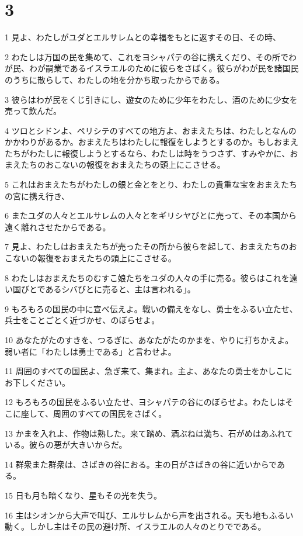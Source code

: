 \chapter{3}

\par 1 見よ、わたしがユダとエルサレムとの幸福をもとに返すその日、その時、
\par 2 わたしは万国の民を集めて、これをヨシャパテの谷に携えくだり、その所でわが民、わが嗣業であるイスラエルのために彼らをさばく。彼らがわが民を諸国民のうちに散らして、わたしの地を分かち取ったからである。
\par 3 彼らはわが民をくじ引きにし、遊女のために少年をわたし、酒のために少女を売って飲んだ。
\par 4 ツロとシドンよ、ペリシテのすべての地方よ、おまえたちは、わたしとなんのかかわりがあるか。おまえたちはわたしに報復をしようとするのか。もしおまえたちがわたしに報復しようとするなら、わたしは時をうつさず、すみやかに、おまえたちのおこないの報復をおまえたちの頭上にこさせる。
\par 5 これはおまえたちがわたしの銀と金とをとり、わたしの貴重な宝をおまえたちの宮に携え行き、
\par 6 またユダの人々とエルサレムの人々とをギリシヤびとに売って、その本国から遠く離れさせたからである。
\par 7 見よ、わたしはおまえたちが売ったその所から彼らを起して、おまえたちのおこないの報復をおまえたちの頭上にこさせる。
\par 8 わたしはおまえたちのむすこ娘たちをユダの人々の手に売る。彼らはこれを遠い国びとであるシバびとに売ると、主は言われる」。
\par 9 もろもろの国民の中に宣べ伝えよ。戦いの備えをなし、勇士をふるい立たせ、兵士をことごとく近づかせ、のぼらせよ。
\par 10 あなたがたのすきを、つるぎに、あなたがたのかまを、やりに打ちかえよ。弱い者に「わたしは勇士である」と言わせよ。
\par 11 周囲のすべての国民よ、急ぎ来て、集まれ。主よ、あなたの勇士をかしこにお下しください。
\par 12 もろもろの国民をふるい立たせ、ヨシャパテの谷にのぼらせよ。わたしはそこに座して、周囲のすべての国民をさばく。
\par 13 かまを入れよ、作物は熟した。来て踏め、酒ぶねは満ち、石がめはあふれている。彼らの悪が大きいからだ。
\par 14 群衆また群衆は、さばきの谷におる。主の日がさばきの谷に近いからである。
\par 15 日も月も暗くなり、星もその光を失う。
\par 16 主はシオンから大声で叫び、エルサレムから声を出される。天も地もふるい動く。しかし主はその民の避け所、イスラエルの人々のとりでである。
